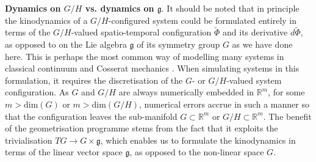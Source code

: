 \textbf{Dynamics on $G/H$ vs. dynamics on $\mathfrak{g}$}. It should be noted that in principle the kinodynamics of a $G/H$-configured system could be formulated entirely in terms of the $G/H$-valued spatio-temporal configuration $\tilde{\Phi}$ and its derivative $d \tilde{\Phi}$, as opposed to on the Lie algebra $\mathfrak{g}$ of its symmetry group $G$ as we have done here. This is perhaps the most common way of modelling many systems in classical continuum and Cosserat mechanics \citep{naughtonElasticaCompliantMechanics2021, powersDynamicsFilamentsMembranes2010, stefanouThreedimensionalCosseratHomogenization2008, caoNonlinearDynamicsElastic2008}. When simulating systems in this formulation, it requires the discretisation of the $G$- or $G/H$-valued system configuration. As $G$ and $G/H$ are always numerically embedded in $\mathbb{R}^m$, for some $m > \text{dim}(G)$ or $m > \text{dim}(G/H)$, numerical errors accrue in such a manner so that the configuration leaves the sub-manifold $G \subset \mathbb{R}^m$ or $G/H \subset \mathbb{R}^m$. The benefit of the geometrisation programme stems from the fact that it exploits the trivialisation $TG \to G \times \mathfrak{g}$, which enables us to formulate the kinodynamics in terms of the linear vector space $\mathfrak{g}$, as opposed to the non-linear space $G$.

